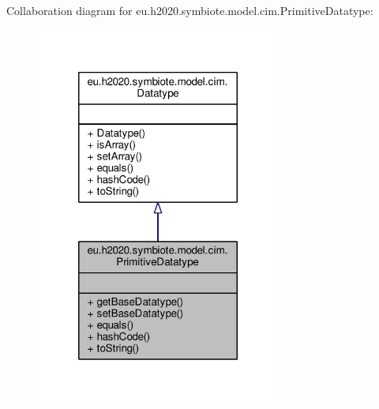 Collaboration diagram for eu.\+h2020.\+symbiote.\+model.\+cim.\+Primitive\+Datatype\+:\nopagebreak
\begin{figure}[H]
\begin{center}
\leavevmode
\includegraphics[width=228pt]{classeu_1_1h2020_1_1symbiote_1_1model_1_1cim_1_1PrimitiveDatatype__coll__graph}
\end{center}
\end{figure}
